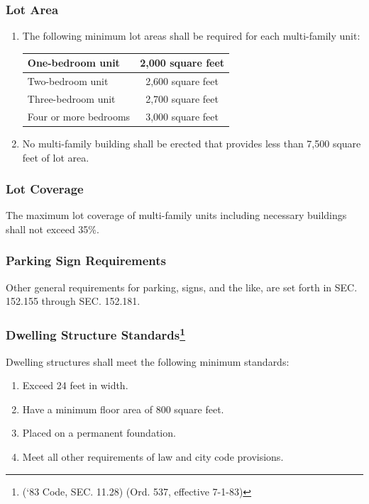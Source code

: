\subsubsection{Lot Area}
\begin{enumerate}[{\indent}a)]
    \item The following minimum lot areas shall be required for each multi-family unit:
        \begin{center}
        \begin{tabular}{|l|c|}
            \hline
            One-bedroom unit & 2,000 square feet\\
            \hline
            Two-bedroom unit & 2,600 square feet\\
            \hline
            Three-bedroom unit & 2,700 square feet\\
            \hline
            Four or more bedrooms & 3,000 square feet\\
            \hline
        \end{tabular}
        \end{center}
    \item No multi-family building shall be erected that provides less than 7,500 square feet of lot area.
\end{enumerate}
\subsubsection{Lot Coverage}
The maximum lot coverage of multi-family units including necessary buildings shall not exceed 35\%.
\subsubsection{Parking Sign Requirements}
Other general requirements for parking, signs, and the like, are set forth in SEC. 152.155 through SEC. 152.181.
\subsubsection{Dwelling Structure Standards\footnote{(‘83 Code, SEC. 11.28)  (Ord. 537, effective 7-1-83)}}
Dwelling structures shall meet the following minimum standards:
\begin{enumerate}[{\indent}a)]
    \item Exceed 24 feet in width.
    \item Have a minimum floor area of 800 square feet.
    \item Placed on a permanent foundation.
    \item Meet all other requirements of law and city code provisions.
\end{enumerate}

